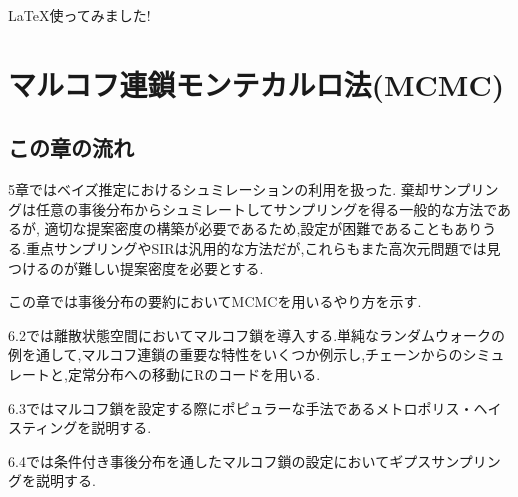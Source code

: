\documentclass{jsarticle}
\begin{document}
{\small \LaTeX 使ってみました!} 
\setcounter{section}{5}

\noindent
\section{\Large \bf マルコフ連鎖モンテカルロ法(MCMC)}
\bigskip

\subsection{\large \bf この章の流れ}

5章ではベイズ推定におけるシュミレーションの利用を扱った. 棄却サンプリングは任意の事後分布からシュミレートしてサンプリングを得る一般的な方法であるが, 適切な提案密度の構築が必要であるため,設定が困難であることもありうる.重点サンプリングやSIRは汎用的な方法だが,これらもまた高次元問題では見つけるのが難しい提案密度を必要とする.

この章では事後分布の要約においてMCMCを用いるやり方を示す.

6.2では離散状態空間においてマルコフ鎖を導入する.単純なランダムウォークの例を通して,マルコフ連鎖の重要な特性をいくつか例示し,チェーンからのシミュレートと,定常分布への移動にRのコードを用いる.

6.3ではマルコフ鎖を設定する際にポピュラーな手法であるメトロポリス・ヘイスティングを説明する.

6.4では条件付き事後分布を通したマルコフ鎖の設定においてギプスサンプリングを説明する.
\end{document}
